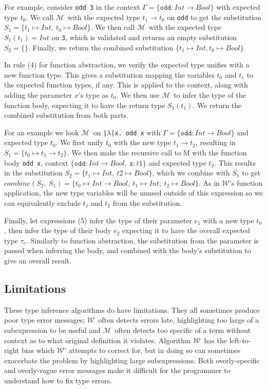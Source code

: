 \documentclass[a4paper,fleqn,oneside,12pt]{report}
\newcommand{\W}{$\mathcal{W}$}
\newcommand{\M}{$\mathcal{M}$}
\begin{document}
For example, consider \texttt{odd 3} in the context $\Gamma = \{ \mathtt{odd} : Int \rightarrow Bool \}$ with expected type $t_0$. We call \M\ with the expected type $t_1 \rightarrow t_0$ on \texttt{odd} to get the substitution $S_1 = \{ t_1 \mapsto Int,\ t_0 \mapsto Bool \}$. We then call \M\ with the expected type $S_1(t_1) = Int$ on \texttt{3}, which is validated and returns an empty substitution $S_2 = \{\}$. Finally, we return the combined substitution $\{ t_1 \mapsto Int, t_0 \mapsto Bool \}$.

In rule (4) for function abstraction, we verify the expected type unifies with a new function type. This gives a substitution mapping the variables $t_0$ and $t_1$ to the expected function types, if any. This is applied to the context, along with adding the parameter $x$’s type as $t_0$. We then use \M\ to infer the type of the function body, expecting it to have the return type $S_1(t_1)$. We return the combined substitution from both parts.

For an example we look \M\ on \texttt{|$\lambda$|x. odd x} with $\Gamma = \{ \mathtt{odd} : Int \rightarrow Bool \}$ and expected type $t_0$. We first unify $t_0$ with the new type $t_1 \rightarrow t_2$, resulting in $S_1 = \{ t_0 \mapsto t_1 \rightarrow t_2 \}$. We then make the recursive call to M with the function body \texttt{odd x}, context $\{ \mathtt{odd} : Int \rightarrow Bool,\ \mathtt{x} : t1 \}$ and expected type $t_2$. This results in the substitution $S_2 = \{ t_1 \mapsto Int,\ t2 \mapsto Bool \}$, which we combine with $S_1$ to get $combine(S_2,\ S_1) = \{ t_0 \mapsto Int \rightarrow Bool,\ t_1 \mapsto Int,\ t_2 \mapsto Bool \}$. As in \W's function application, the new type variables will be unused outside of this expression so we can equivalently exclude $t_1$ and $t_2$ from the substitution.

Finally, let expressions (5) infer the type of their parameter $e_1$ with a new type $t_0$, then infer the type of their body $e_2$ expecting it to have the overall expected type $\tau_e$. Similarly to function abstraction, the substitution from the parameter is passed when inferring the body, and combined with the body’s substitution to give an overall result.

\subsection{Limitations}

These type inference algorithms do have limitations. They all sometimes produce poor type error messages; \W\ often detects errors late, highlighting too large of a subexpression to be useful and \M\ often detects too specific of a term without context as to what original definition it violates. Algorithm \W\ has the left-to-right bias which \W' attempts to correct for, but in doing so can sometimes exacerbate the problem by highlighting large subexpressions. Both overly-specific and overly-vague error messages make it difficult for the programmer to understand how to fix type errors.
\end{document}
